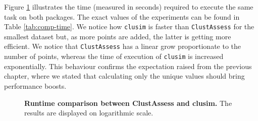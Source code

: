 Figure \ref{fig:comp-time} illustrates the time (measured in seconds) required to execute the same task on both packages. The exact values of the experiments can be found in Table \ref{tab:comp-time}. We notice how \verb|clusim| is faster than \verb|ClustAssess| for the smallest dataset but, as more points are added, the latter is getting more efficient. We notice that \verb|ClustAssess| has a linear grow proportionate to the number of points, whereas the time of execution of \verb|clusim| is increased exponentially. This behaviour confirms the expectation raised from the previous chapter, where we stated that calculating only the unique values should bring performance boosts.


\begin{figure}[H]
    \centering
    \caption{\label{fig:comp-time}\textbf{Runtime comparison between ClustAssess and clusim.} The results are displayed on logarithmic scale.}
\end{figure}


\begin{table}[]

\caption{\label{tab:comp-time} Runtime of ClustAssess and clusim on datasets with various sizes, measured in seconds.}
\end{table}

